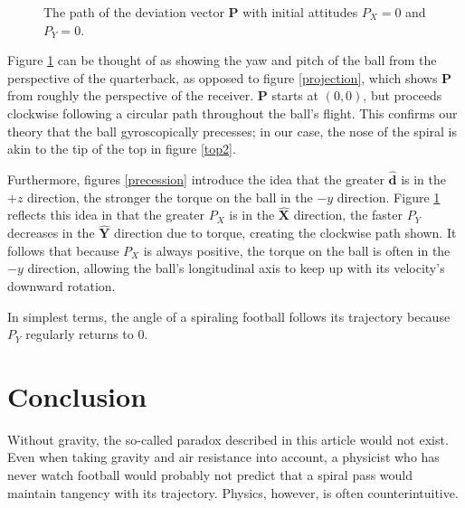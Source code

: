 \documentclass{article}
\begin{document}
\begin{figure}[h!]
    \centering
    \caption{The path of the deviation vector $\mathbf{P}$ with initial attitudes $P_X = 0$ and $P_Y = 0$.}
    \label{P parametric}
\end{figure}
Figure \ref{P parametric} can be thought of as showing the yaw and pitch of the ball from the perspective of the quarterback, as opposed to figure \ref{projection}, which shows $\mathbf{P}$ from roughly the perspective of the receiver. $\mathbf{P}$ starts at $(0, 0)$, but proceeds clockwise following a circular path throughout the ball's flight. This confirms our theory that the ball gyroscopically precesses; in our case, the nose of the spiral is akin to the tip of the top in figure \ref{top2}.

Furthermore, figures \ref{precession} introduce the idea that the greater $\mathbf{\hat{d}}$ is in the $+z$ direction, the stronger the torque on the ball in the $-y$ direction. Figure \ref{P parametric} reflects this idea in that the greater $P_X$ is in the $\mathbf{\hat{X}}$ direction, the faster $P_Y$ decreases in the $\mathbf{\hat{Y}}$ direction due to torque, creating the clockwise path shown. It follows that because $P_X$ is always positive, the torque on the ball is often in the $-y$ direction, allowing the ball's longitudinal axis to keep up with its velocity's downward rotation.

In simplest terms, the angle of a spiraling football follows its trajectory because $P_Y$ regularly returns to $0$.

\section{Conclusion}
Without gravity, the so-called paradox described in this article would not exist. Even when taking gravity and air resistance into account, a physicist who has never watch football would probably not predict that a spiral pass would maintain tangency with its trajectory. Physics, however, is often counterintuitive. 
\end{document}
